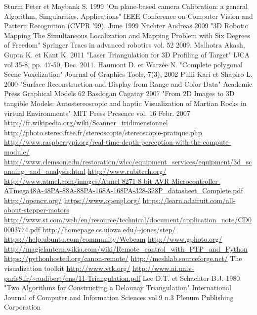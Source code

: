 \documentclass[a4paper,10pt]{report}
\begin{document}
\begin{thebibliography}{1}
 Sturm Peter et Maybank S. 1999 "On plane-based camera Calibration: a general Algorithm, Singularities, Applications" IEEE Conference on Computer Vision and Pattern Recognition (CVPR '99), June 1999
 Nüchter Andreas 2009 "3D Robotic Mapping The Simultaneous Localization and Mapping Problem with Six Degrees of Freedom" Springer Tracs in advanced robotics vol. 52 2009.
 Malhotra Akash, Gupta K. et Kant K. 2011 "Laser Triangulation for 3D Profiling of Target" IJCA vol 35-8, pp. 47-50, Dec. 2011.
 Haumont D. et Warzée N. "Complete polygonal Scene Voxelization" Journal of Graphics Tools, 7(3), 2002
 Pulli Kari et Shapiro L. 2000 "Surface Reconstruction and Display from Range and Color Data" Academic Press Graphical Models 62
 Basdogan Cagatay 2007 "From 2D Images to 3D tangible Models: Autostereoscopic and haptic Visualization of Martian Rocks in virtual Environments" MIT Press Presence vol. 16 Febr. 2007
 \url{http://fr.wikipedia.org/wiki/Scanner_tridimensionnel}
 \url{http://photo.stereo.free.fr/stereoscopie/stereoscopie-pratique.php}
 \url{http://www.raspberrypi.org/real-time-depth-perception-with-the-compute-module/}
 \url{http://www.clemson.edu/restoration/wlcc/equipment_services/equipment/3d_scanning_and_analysis.html}
 \url{http://www.rubitech.org/}
 \url{http://www.atmel.com/images/Atmel-8271-8-bit-AVR-Microcontroller-ATmega48A-48PA-88A-88PA-168A-168PA-328-328P_datasheet_Complete.pdf}
 \url{http://opencv.org/}
 \url{https://www.opengl.org/}
 \url{https://learn.adafruit.com/all-about-stepper-motors}
 \url{http://www.st.com/web/en/resource/technical/document/application_note/CD00003774.pdf}
 \url{http://homepage.cs.uiowa.edu/~jones/step/}
 \url{https://help.ubuntu.com/community/Webcam}
 \url{http://www.gphoto.org/}
 \url{http://magiclantern.wikia.com/wiki/Remote_control_with_PTP_and_Python}
 \url{https://pythonhosted.org/canon-remote/}
 \url{http://meshlab.sourceforge.net/}
 The visualization toolkit \url{http://www.vtk.org/}
 \url{http://www.ai.univ-paris8.fr/~audibert/ens/11-Triangulation.pdf}
 Lee D.T. et Schachter B.J. 1980 "Two Algorithms for Constructing a Delaunay Triangulation" International Journal of Computer and Information Sciences vol.9 n.3 Plenum Publishing Corporation

\end{thebibliography}
\end{document}
